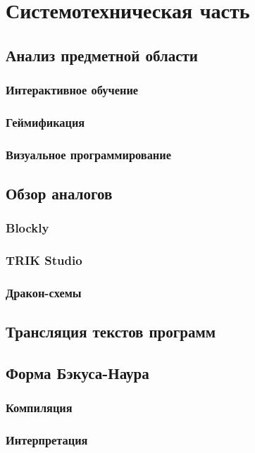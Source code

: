 \chapter{Системотехническая часть}

\section{Анализ предметной области}
\subsection{Интерактивное обучение}
\subsection{Геймификация}
\subsection{Визуальное программирование}
\section{Обзор аналогов}
\subsection{Blockly}
\subsection{TRIK Studio}
\subsection{Дракон-схемы}
\section{Трансляция текстов программ}
\section{Форма Бэкуса-Наура}
\subsection{Компиляция}
\subsection{Интерпретация}
